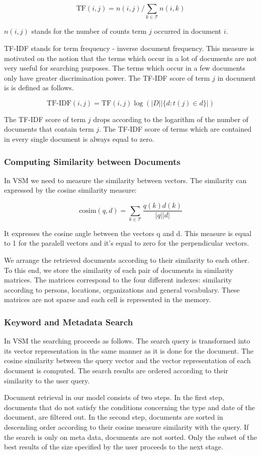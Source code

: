 \[\text{TF}(i,j) = n(i,j) / \sum_{k \in \mathcal{T}}{n(i,k)}\]


$n(i,j)$ stands for the number of counts term $j$ occurred in document $i$.


TF-IDF stands for term frequency - inverse document frequency. This measure is motivated on the notion that the terms which occur in a lot of documents are not very useful for searching purposes. The terms which occur in a few documents only have greater discrimination power. The TF-IDF score of term $j$ in document is is defined as follows.

\[\text{TF-IDF}(i,j) = \text{TF}(i,j)\log{(|D| |\lbrace d : t(j) \in d \rbrace|)}\]

The TF-IDF score of term $j$ drops according to the logarithm of the number of documents that contain term $j$. The TF-IDF score of terms which are contained in every single document is always equal to zero.

\subsubsection{Computing Similarity between Documents}\label{sec:computing_similarity_between_documents}

In VSM we need to measure the similarity between vectors. The similarity can expressed by the cosine similarity measure:

\[\text{cosim}(q,d) = \sum_{k \in \mathcal{T}}\frac{q(k)d(k)}{|q||d|}\]

It expresses the cosine angle between the vectors q and d. This measure is equal to 1 for the paralell vectors and it's equal to zero for the perpendicular vectors.

We arrange the retrieved documents according to their similarity to each other. To this end, we store the similarity of each pair of documents in similarity matrices. The matrices correspond to the four different indexes: similarity according to persons, locations, organizations and general vocabulary. These matrices are not sparse and each cell is represented in the memory.   

\subsubsection{Keyword and Metadata Search}\label{sec:keyword_search}

In VSM the searching proceeds as follows. The search query is transformed into its vector representation in the same manner as it is done for the document. The cosine similarity between the query vector and the vector representation of each document is computed. The search results are ordered according to their similarity to the user query. 

Document retrieval in our model consists of two steps. In the first step, documents that do not satisfy the conditions concerning the type and date of the document, are filtered out. In the second step, documents are sorted in descending order according to their cosine measure similarity with the query. If the search is only on meta data, documents are not sorted. Only the subset of the best results of the size specified by the user proceeds to the next stage.




